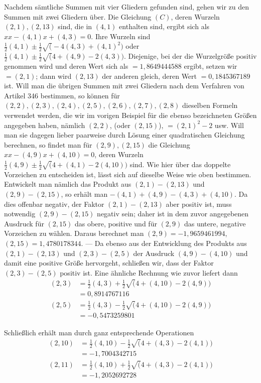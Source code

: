 Nachdem sämtliche Summen mit vier Gliedern gefunden sind, gehen wir zu den Summen mit zwei Gliedern über. Die Gleichung \((C)\), deren Wurzeln \((2,1),\allowbreak (2,13)\) sind, die in \((4,1)\) enthalten sind, ergibt sich als \(xx-(4,1)x+(4,3)=0\). Ihre Wurzeln sind \(\frac12(4,1)\pm\frac12\surd(-4(4,3)+(4,1)^2)\) oder \(\frac12(4,1)\pm\frac12\surd(4+(4,9)-2(4,3))\). Diejenige, bei der die Wurzelgröße positiv genommen wird und deren Wert sich als \(=1{,}8649444588\) ergibt, setzen wir \(=(2,1)\); dann wird \((2,13)\) der anderen gleich, deren Wert \(=0{,}1845367189\) ist. Will man die übrigen Summen mit zwei Gliedern nach dem Verfahren von Artikel 346 bestimmen, so können für \((2,2),\allowbreak (2,3),\allowbreak (2,4),\allowbreak (2,5),\allowbreak (2,6),\allowbreak (2,7),\allowbreak (2,8)\) dieselben Formeln verwendet werden, die wir im vorigen Beispiel für die ebenso bezeichneten Größen angegeben haben, nämlich \((2,2)\), (oder \((2,15)\)), \(=(2,1)^2-2\) usw. Will man sie dagegen lieber paarweise durch Lösung einer quadratischen Gleichung berechnen, so findet man für \((2,9),\allowbreak (2,15)\) die Gleichung \(xx-(4,9)x+(4,10)=0\), deren Wurzeln \(\frac12(4,9)\pm\frac12\surd(4+(4,1)-2(4,10))\) sind. Wie hier über das doppelte Vorzeichen zu entscheiden ist, lässt sich auf dieselbe Weise wie oben bestimmen. Entwickelt man nämlich das Produkt aus \((2,1)-(2,13)\) und \((2,9)-(2,15)\), so erhält man \(-(4,1)+(4,9)-(4,3)+(4,10)\). Da dies offenbar negativ, der Faktor \((2,1)-(2,13)\) aber positiv ist, muss notwendig \((2,9)-(2,15)\)
negativ sein; daher ist in dem zuvor angegebenen Ausdruck für \((2,15)\) das obere, positive und für \((2,9)\) das untere, negative Vorzeichen zu wählen. Daraus berechnet man \((2,9)=-1{,}9659461994\), \((2,15)=1{,}4780178344\). — Da ebenso aus der Entwicklung des Produkts aus \((2,1)-(2,13)\) und \((2,3)-(2,5)\) der Ausdruck \((4,9)-(4,10)\) und damit eine positive Größe hervorgeht, schließen wir, dass der Faktor \((2,3)-(2,5)\) positiv ist. Eine ähnliche Rechnung wie zuvor liefert dann \[\begin{aligned}(2,3)&=\tfrac12(4,3)+\tfrac12\surd(4+(4,10)-2(4,9))\\&=0{,}8914767116\\(2,5)&=\tfrac12(4,3)-\tfrac12\surd(4+(4,10)-2(4,9))\\&=-0{,}5473259801\end{aligned}\]

Schließlich erhält man durch ganz entsprechende Operationen \[\begin{aligned}(2,10)&=\tfrac12(4,10)-\tfrac12\surd(4+(4,3)-2(4,1))\\&=-1{,}7004342715\\(2,11)&=\tfrac12(4,10)+\tfrac12\surd(4+(4,3)-2(4,1))\\&=-1{,}2052692728\end{aligned}\]

